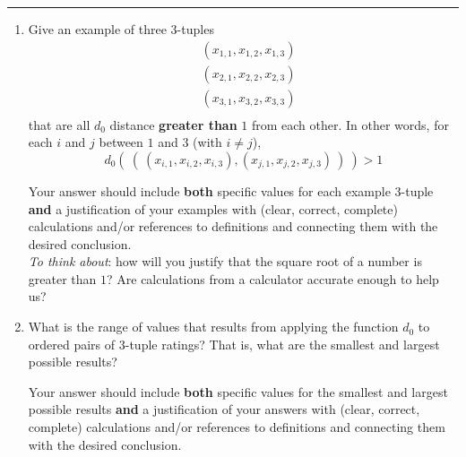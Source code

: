 \begin{enumerate}
\rule{0.5\textwidth}{.4pt}

\begin{enumerate}
    \item Give an example of three $3$-tuples 
    \begin{align*}
    &(x_{1,1}, x_{1,2}, x_{1,3}) \\
    &(x_{2,1}, x_{2,2}, x_{2,3}) \\
    &(x_{3,1}, x_{3,2}, x_{3,3}) \\
    \end{align*}
    that are all $d_0$ distance {\bf greater than} $1$ from each other.  
    In other words, for each $i$ and $j$ between $1$ and 
    $3$ (with $i \neq j$), 
    \[
    d_{0}(~(~(x_{i,1}, x_{i,2}, x_{i,3})  , (x_{j,1}, x_{j,2}, x_{j,3})~)~) > 1
    \]
    
    Your answer should include  {\bf both} specific values for each example $3$-tuple {\bf and} a justification 
    of your examples with (clear, correct, complete) calculations and/or references to definitions and connecting them with
    the desired conclusion.\\
    
    {\it To think about}: 
    how will you justify that the square root of a number is greater than $1$?
    Are calculations from a calculator accurate enough to help us?

    \item What is the range of values that results from applying the function $d_0$
    to ordered pairs of $3$-tuple ratings? That is, what are the smallest and largest
    possible results?

    Your answer should include  {\bf both} specific values for the smallest and largest 
    possible results {\bf and} a justification 
    of your answers with (clear, correct, complete) calculations and/or references to definitions and connecting them with
    the desired conclusion.
\end{enumerate}
\end{enumerate}
